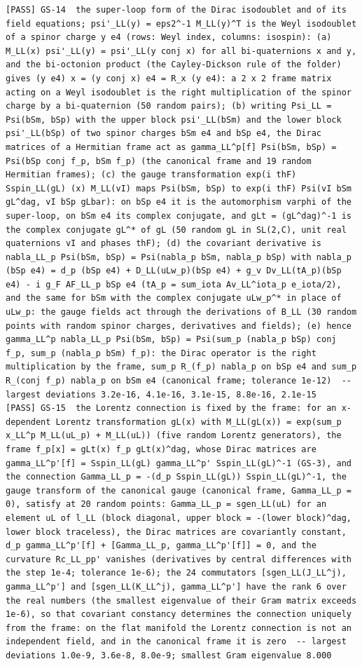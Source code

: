 \documentclass[
  10pt,
]{article}
\begin{document}
\begin{verbatim}
[PASS] GS-14  the super-loop form of the Dirac isodoublet and of its field equations; psi'_LL(y) = eps2^-1 M_LL(y)^T is the Weyl isodoublet of a spinor charge y e4 (rows: Weyl index, columns: isospin): (a) M_LL(x) psi'_LL(y) = psi'_LL(y conj x) for all bi-quaternions x and y, and the bi-octonion product (the Cayley-Dickson rule of the folder) gives (y e4) x = (y conj x) e4 = R_x (y e4): a 2 x 2 frame matrix acting on a Weyl isodoublet is the right multiplication of the spinor charge by a bi-quaternion (50 random pairs); (b) writing Psi_LL = Psi(bSm, bSp) with the upper block psi'_LL(bSm) and the lower block psi'_LL(bSp) of two spinor charges bSm e4 and bSp e4, the Dirac matrices of a Hermitian frame act as gamma_LL^p[f] Psi(bSm, bSp) = Psi(bSp conj f_p, bSm f_p) (the canonical frame and 19 random Hermitian frames); (c) the gauge transformation exp(i thF) Sspin_LL(gL) (x) M_LL(vI) maps Psi(bSm, bSp) to exp(i thF) Psi(vI bSm gL^dag, vI bSp gLbar): on bSp e4 it is the automorphism varphi of the super-loop, on bSm e4 its complex conjugate, and gLt = (gL^dag)^-1 is the complex conjugate gL^* of gL (50 random gL in SL(2,C), unit real quaternions vI and phases thF); (d) the covariant derivative is nabla_LL_p Psi(bSm, bSp) = Psi(nabla_p bSm, nabla_p bSp) with nabla_p (bSp e4) = d_p (bSp e4) + D_LL(uLw_p)(bSp e4) + g_v Dv_LL(tA_p)(bSp e4) - i g_F AF_LL_p bSp e4 (tA_p = sum_iota Av_LL^iota_p e_iota/2), and the same for bSm with the complex conjugate uLw_p^* in place of uLw_p: the gauge fields act through the derivations of B_LL (30 random points with random spinor charges, derivatives and fields); (e) hence gamma_LL^p nabla_LL_p Psi(bSm, bSp) = Psi(sum_p (nabla_p bSp) conj f_p, sum_p (nabla_p bSm) f_p): the Dirac operator is the right multiplication by the frame, sum_p R_(f_p) nabla_p on bSp e4 and sum_p R_(conj f_p) nabla_p on bSm e4 (canonical frame; tolerance 1e-12)  -- largest deviations 3.2e-16, 4.1e-16, 3.1e-15, 8.8e-16, 2.1e-15
[PASS] GS-15  the Lorentz connection is fixed by the frame: for an x-dependent Lorentz transformation gL(x) with M_LL(gL(x)) = exp(sum_p x_LL^p M_LL(uL_p) + M_LL(uL)) (five random Lorentz generators), the frame f_p[x] = gLt(x) f_p gLt(x)^dag, whose Dirac matrices are gamma_LL^p'[f] = Sspin_LL(gL) gamma_LL^p' Sspin_LL(gL)^-1 (GS-3), and the connection Gamma_LL_p = -(d_p Sspin_LL(gL)) Sspin_LL(gL)^-1, the gauge transform of the canonical gauge (canonical frame, Gamma_LL_p = 0), satisfy at 20 random points: Gamma_LL_p = sgen_LL(uL) for an element uL of l_LL (block diagonal, upper block = -(lower block)^dag, lower block traceless), the Dirac matrices are covariantly constant, d_p gamma_LL^p'[f] + [Gamma_LL_p, gamma_LL^p'[f]] = 0, and the curvature Rc_LL_pp' vanishes (derivatives by central differences with the step 1e-4; tolerance 1e-6); the 24 commutators [sgen_LL(J_LL^j), gamma_LL^p'] and [sgen_LL(K_LL^j), gamma_LL^p'] have the rank 6 over the real numbers (the smallest eigenvalue of their Gram matrix exceeds 1e-6), so that covariant constancy determines the connection uniquely from the frame: on the flat manifold the Lorentz connection is not an independent field, and in the canonical frame it is zero  -- largest deviations 1.0e-9, 3.6e-8, 8.0e-9; smallest Gram eigenvalue 8.000

\end{verbatim}
\end{document}
